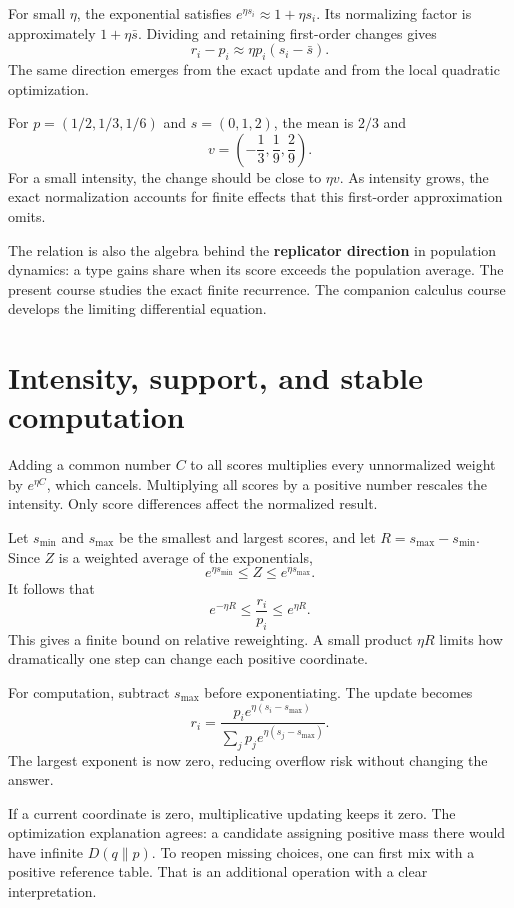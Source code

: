 \documentclass[11pt,oneside,openany]{book}
\theoremstyle{definition}
\theoremstyle{remark}
\numberwithin{equation}{chapter}
\begin{document}
For small \(\eta\), the exponential satisfies \(e^{\eta s_i}\approx1+\eta s_i\). Its normalizing factor is approximately \(1+\eta\bar s\). Dividing and retaining first-order changes gives \[r_i-p_i\approx\eta p_i(s_i-\bar s).\] The same direction emerges from the exact update and from the local quadratic optimization.

For \(p=(1/2,1/3,1/6)\) and \(s=(0,1,2)\), the mean is \(2/3\) and \[v=\left(-\frac13,\frac19,\frac29\right).\] For a small intensity, the change should be close to \(\eta v\). As intensity grows, the exact normalization accounts for finite effects that this first-order approximation omits.

The relation is also the algebra behind the \textbf{replicator direction} in population dynamics: a type gains share when its score exceeds the population average. The present course studies the exact finite recurrence. The companion calculus course develops the limiting differential equation.

\section{Intensity, support, and stable computation}\label{ch09-intensity-support-and-stable-computation}

Adding a common number \(C\) to all scores multiplies every unnormalized weight by \(e^{\eta C}\), which cancels. Multiplying all scores by a positive number rescales the intensity. Only score differences affect the normalized result.

Let \(s_{\min}\) and \(s_{\max}\) be the smallest and largest scores, and let \(R=s_{\max}-s_{\min}\). Since \(Z\) is a weighted average of the exponentials, \[e^{\eta s_{\min}}\leq Z\leq e^{\eta s_{\max}}.\] It follows that \[e^{-\eta R}\leq\frac{r_i}{p_i}\leq e^{\eta R}.\] This gives a finite bound on relative reweighting. A small product \(\eta R\) limits how dramatically one step can change each positive coordinate.

For computation, subtract \(s_{\max}\) before exponentiating. The update becomes \[r_i=\frac{p_i e^{\eta(s_i-s_{\max})}}
{\sum_jp_j e^{\eta(s_j-s_{\max})}}.\] The largest exponent is now zero, reducing overflow risk without changing the answer.

If a current coordinate is zero, multiplicative updating keeps it zero. The optimization explanation agrees: a candidate assigning positive mass there would have infinite \(D(q\|p)\). To reopen missing choices, one can first mix with a positive reference table. That is an additional operation with a clear interpretation.
\end{document}
